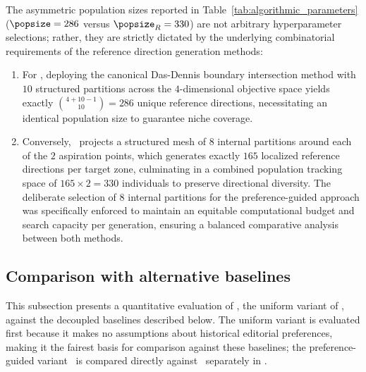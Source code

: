 \begin{table}[htbp]
\caption{Domain-specific coefficients and evolutionary hyperparameters for the \methodName\ method.}
\label{tab:algorithmic_parameters}
\end{table}

The asymmetric population sizes reported in Table~\ref{tab:algorithmic_parameters} ($\popsize = 286$ versus $\popsize_R = 330$) are not arbitrary hyperparameter selections; rather, they are strictly dictated by the underlying combinatorial requirements of the reference direction generation methods:
\begin{enumerate}
    \item For \methodNameUniform, deploying the canonical Das-Dennis boundary intersection method with $10$ structured partitions across the $4$-dimensional objective space yields exactly $\binom{4 + 10 - 1}{10} = 286$ unique reference directions, necessitating an identical population size to guarantee niche coverage. 
    \item Conversely, \methodName\ projects a structured mesh of $8$ internal partitions around each of the $2$ aspiration points, which generates exactly $165$ localized reference directions per target zone, culminating in a combined population tracking space of $165 \times 2 = 330$ individuals to preserve directional diversity. The deliberate selection of $8$ internal partitions for the preference-guided approach was specifically enforced to maintain an equitable computational budget and search capacity per generation, ensuring a balanced comparative analysis between both methods.
\end{enumerate}






\subsection{Comparison with alternative baselines}

This subsection presents a quantitative evaluation of \methodNameUniform, the uniform variant of \methodNameGeneral, against the decoupled baselines described below. The uniform variant is evaluated first because it makes no assumptions about historical editorial preferences, making it the fairest basis for comparison against these baselines; the preference-guided variant \methodName\ is compared directly against \methodNameUniform\ separately in .

